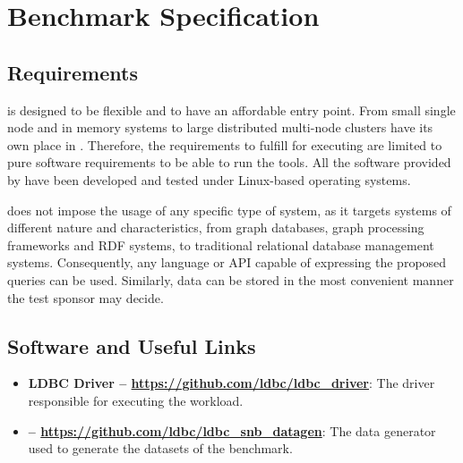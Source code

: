 \chapter{Benchmark Specification}
\label{section:benchmark-specification}

\section{Requirements}

\ldbcsnb is designed to be flexible and to have an affordable entry point.
From small single node and in memory systems to large distributed multi-node
clusters have its own place in \ldbcsnb.  Therefore, the requirements to
fulfill for executing \ldbcsnb are limited to pure software requirements to be
able to run the tools. All the software provided by \ldbcsnb have been
developed and tested under Linux-based operating systems.

\ldbcsnb does not impose the usage of any specific type of system, as it
targets systems of different nature and characteristics, from graph databases,
graph processing frameworks and RDF systems, to traditional relational database
management systems. Consequently, any language or API capable of expressing the
proposed queries can be used. Similarly, data can be stored in the most
convenient manner the test sponsor may decide.



\section{Software and Useful Links}

\begin{itemize}
	\item \textbf{LDBC Driver -- \url{https://github.com/ldbc/ldbc_driver}}: The driver
	responsible for executing the \ldbcsnb workload.
	\item \textbf{\datagen -- \url{https://github.com/ldbc/ldbc_snb_datagen}}: The data
	generator used to generate the datasets of the benchmark.
\end{itemize}

